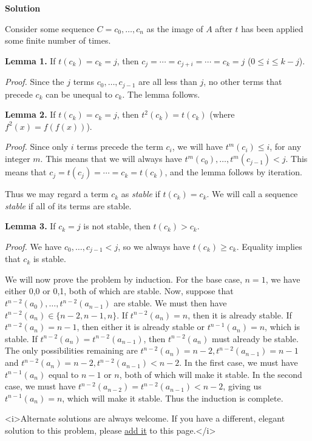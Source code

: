\begin{enumerate}
 



\textbf{Solution}

Consider some sequence $C = c_0, \ldots, c_n$ as the image of $A$ after $t$ has been applied some finite number of times.

 \textbf{Lemma 1.}  If $t(c_k) = c_k = j$, then ${} c_j = \cdots = c_{j+i} = \cdots = c_k = j$ ($0 \le i \le k-j$).

 \textit{Proof.} Since the $j$ terms $c_0, \ldots, c_{j-1}$ are all less than $j$, no other terms that precede $c_{k}$ can be unequal to $c_k$.  The lemma follows.

 \textbf{Lemma 2.} If $t(c_k) = c_k = j$, then $t^2(c_k) = t(c_k)$ (where $f^2(x) = f(f(x))$).

 \textit{Proof.}  Since only $i$ terms precede the term $c_i$, we will have $t^m(c_i) \le i$, for any integer $m$.  This means that we will always have $t^m (c_0), \ldots, t^m (c_{j-1}) < j$.  This means that $c_j = t(c_j) = \cdots = c_k = t(c_k)$, and the lemma follows by iteration.

 Thus we may regard a term $c_k$ as \textit{stable} if $t(c_k) = c_k$.  We will call a sequence \textit{stable} if all of its terms are stable.

 \textbf{Lemma 3.}  If $c_k =j$ is not stable, then $t(c_k) > c_k$.

 \textit{Proof.} We have $c_0, \ldots, c_{j-1} < j$, so we always have $t(c_k) \ge c_k$.  Equality implies that $c_k$ is stable.

 We will now prove the problem by induction.  For the base case, $n=1$, we have either 0,0 or 0,1, both of which are stable.  Now, suppose that $t^{n-2}(a_0), \ldots, t^{n-2}(a_{n-1})$ are stable.  We must then have $t^{n-2}(a_n) \in \{ n-2, n-1, n\}$.  If $t^{n-2}(a_n) = n$, then it is already stable.  If $t^{n-2}(a_n) = n-1$, then either it is already stable or $t^{n-1}(a_n) = n$, which is stable.  If $t^{n-2}(a_n) = t^{n-2}(a_{n-1})$, then $t^{n-2}(a_n)$ must already be stable.  The only possibilities remaining are $t^{n-2}(a_n) = n-2, t^{n-2}(a_{n-1}) = n-1$ and $t^{n-2}(a_n) = n-2, t^{n-2}(a_{n-1}) < n-2$.  In the first case, we must have $t^{n-1}(a_n)$ equal to $n-1$ or $n$, both of which will make it stable.  In the second case, we must have $t^{n-2}(a_{n-2}) = t^{n-2}(a_{n-1}) < n-2$, giving us $t^{n-1}(a_n) = n$, which will make it stable.  Thus the induction is complete.

 
<i>Alternate solutions are always welcome. If you have a different, elegant solution to this problem, please \href{https://artofproblemsolving.com/wiki/index.php?title=2003\_USAMO\_Problems/Problem\_3&action=edit}{add it} to this page.</i>




\end{enumerate}

